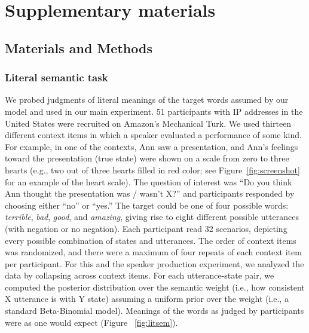 \documentclass[12pt]{article}
\begin{document}

\section*{Supplementary materials}

\subsection*{Materials and Methods}\label{materials-and-methods}

\subsubsection*{Literal semantic task}\label{literal-semantic-task}

We probed judgments of literal meanings of the target words assumed by
our model and used in our main experiment. 51 participants with IP
addresses in the United States were recruited on Amazon's Mechanical
Turk. We used thirteen different context items in which a speaker
evaluated a performance of some kind. For example, in one of the
contexts, Ann saw a presentation, and Ann's feelings toward the
presentation (true state) were shown on a scale from zero to three
hearts (e.g., two out of three hearts filled in red color; see
Figure~\ref{fig:screenshot} for an example of the heart scale). The
question of interest was \enquote{Do you think Ann thought the
presentation was / wasn't X?} and participants responded by choosing
either \enquote{no} or \enquote{yes.} The target could be one of four
possible words: \emph{terrible}, \emph{bad}, \emph{good}, and
\emph{amazing}, giving rise to eight different possible utterances (with
negation or no negation). Each participant read 32 scenarios, depicting
every possible combination of states and utterances. The order of
context items was randomized, and there were a maximum of four repeats
of each context item per participant. For this and the speaker
production experiment, we analyzed the data by collapsing across context
items. For each utterance-state pair, we computed the posterior
distribution over the semantic weight (i.e., how consistent X utterance
is with Y state) assuming a uniform prior over the weight (i.e., a
standard Beta-Binomial model). Meanings of the words as judged by
participants were as one would expect (Figure ~\ref{fig:litsem}).
\end{document}
